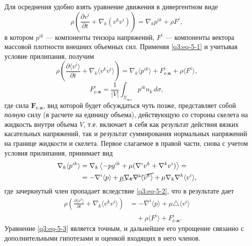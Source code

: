 Для осреднения удобно взять уравнение движения в дивергентном виде
\[
\rho\left(\frac{\partial v^i}{\partial t}+\nabla_k(v^kv^i)\right)=\nabla_kp^{ik}+\rho F^i,
\]
в котором $p^{ik}$ --- компоненты тензора напряжений, $F^i$ --- компоненты вектора массовой плотности внешних объемных сил. Применяя \eqref{q3:eq-5-1} и учитывая условие прилипания, получим
\[
\rho\left(\frac{\partial\langle v^i\rangle}{\partial t}+\nabla_k\langle v^kv^i\rangle\right)=\nabla_k\langle p^{ik}\rangle+F^i_{\text{с-ж}}+\rho\langle F^i\rangle,
\]
\[
F^i_{\text{с-ж}}=\frac{1}{|V|}\int_{\Sigma_{\text{ж-с}}}p^{ik}n_k\,d\sigma,
\]
где сила $\boldsymbol{F}_{\text{с-ж}}$, вид которой будет обсуждаться чуть позже, представляет собой \textit{полную} силу (в расчете на единицу объема), действующую со стороны скелета на жидкость внутри объема $V$, т.е. включает в себя как результат действия вязких касательных напряжений, так и результат суммирования нормальных напряжений на границе жидкости и скелета. Первое слагаемое в правой части, снова с учетом условия прилипания, принимает вид
\[
\begin{aligned}
\nabla_k\langle p^{ik}\rangle
&=\nabla_k\left\langle-pg^{ik}+\mu(\nabla^iv^k+\nabla^kv^i)\right\rangle=\\
&=-\nabla^i\langle p\rangle+\cancel{\mu\nabla_k\nabla^i\langle v^k\rangle}+\mu\nabla_k\nabla^k\langle v^i\rangle,
\end{aligned}
\]
где зачеркнутый член пропадает вследствие \eqref{q3:eq-5-2}, что в результате дает
\begin{equation}
\begin{aligned}
\rho\left(\frac{\partial\langle v^i\rangle}{\partial t}+\nabla_k\langle v^kv^i\rangle\right)
&=-\nabla^i\langle p\rangle+\mu\triangle\langle v^i\rangle\\
&\quad+\rho\langle F^i\rangle+F^i_{\text{с-ж}}.
\end{aligned}
\tag{5.3}\label{q3:eq-5-3}
\end{equation}
Уравнение \eqref{q3:eq-5-3} является точным, и дальнейшее его упрощение связанно с дополнительными гипотезами и оценкой входящих в него членов.

